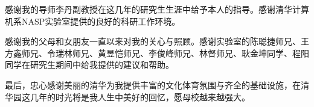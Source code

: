 \begin{acknowledgement}
感谢我的导师李丹副教授在这几年的研究生生涯中给予本人的指导。感谢清华计算机系NASP实验室提供的良好的科研工作环境。

感谢我的父母和女朋友一直以来对我的关心与照顾。感谢实验室的陈聪捷师兄、王方鑫师兄、令瑞林师兄、黄昱恺师兄、李俊峰师兄、林督师兄、耿金坤同学、程阳同学在研究生期间中给我提供的建议和帮助。

最后，忠心感谢美丽的清华为我提供丰富的文化体育氛围与齐全的基础设施，在清华园这几年的时光将是我人生中美好的回忆，愿母校越来越强大。

\end{acknowledgement}
